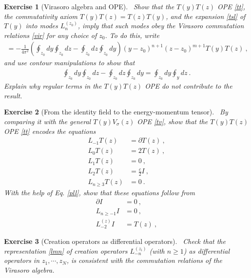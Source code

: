 \documentclass[12pt, a4paper, notitlepage, twoside]{report}
\numberwithin{equation}{section}
\theoremstyle{break}
\newtheorem{exo}{Exercise}[chapter]
\begin{document}
\begin{exo}[Virasoro algebra and OPE] 
~\label{exott}
Show that the $T(y)T(z)$ OPE \eqref{tt}, the commutativity axiom $T(y)T(z) = T(z)T(y)$, and the expansion \eqref{tsl} of $T(y)$ into modes $L_n^{(z_0)}$, imply that such modes obey the Virasoro commutation relations \eqref{vir} for any choice of $z_0$.
To do this, write 
\begin{align}
 [L_n^{(z_0)},L_m^{(z_0)}] = -\frac{1}{4\pi^2} \left(\oint_{z_0} dy \oint_{z_0} dz - \oint_{z_0} dz \oint_{z_0} dy\right) (y-z_0)^{n+1}(z-z_0)^{m+1} T(y)T(z)\ ,
\end{align}
and use contour manipulations to show that 
\begin{align}
 \oint_{z_0} dy \oint_{z_0} dz - \oint_{z_0} dz \oint_{z_0} dy = \oint_{z_0} dy \oint_y dz\ .
\end{align}
Explain why regular terms in the $T(y)T(z)$ OPE do not contribute to the result.
\end{exo}

\begin{exo}[From the identity field to the energy-momentum tensor]
 ~\label{exoit}
By comparing it with the general $T(y)V_\sigma(z)$ OPE \eqref{tv}, show that the $T(y)T(z)$ OPE \eqref{tt} encodes the equations
\begin{align}
 L_{-1}T(z) &= \partial T(z) \ ,
\label{lmt}
\\
L_0 T(z) &= 2 T(z)\ ,
\\
L_1 T(z) &= 0 \ ,
\\
L_2 T(z) &= \frac{c}{2} I\ ,
\\
L_{n\geq 3} T(z) &= 0 \ .
\label{lgt}
\end{align}
With the help of Eq. \eqref{pll}, show that these equations follow from 
\begin{align}
 \partial I & = 0\ ,
\label{piz}
\\
 L_{n\geq -1} I& = 0\ ,
\\
L_{-2}^{(z)}I & = T(z)\ ,
\label{let}
\end{align}
\end{exo}


\begin{exo}[Creation operators as differential operators]
 ~\label{exodma}
 Check that the representation \eqref{lmn} of creation operators $L_{-n}^{(z_i)}$ (with $n\geq 1$) as differential operators in $z_1,\cdots , z_N$, is consistent with the commutation relations of the Virasoro algebra. 
\end{exo}
\end{document}
